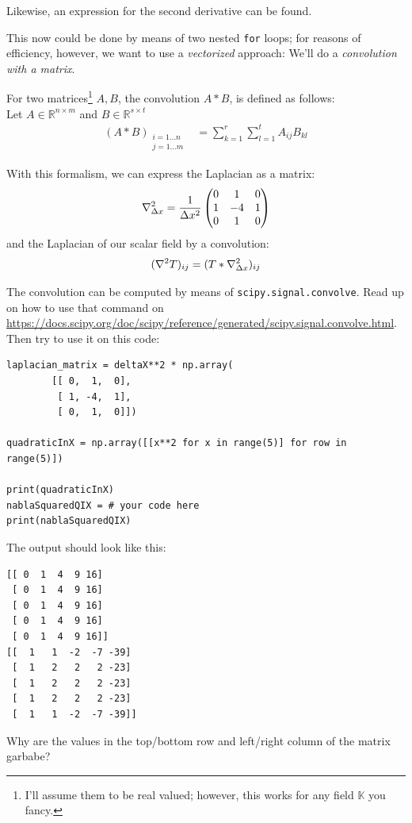 \documentclass[
	english,
	fontsize=10pt,
	parskip=half,
	titlepage=true,
	DIV=12
]{scrartcl}
\newcommand*{\inPy}[1]{\texttt{#1}}
\begin{document}
Likewise, an expression for the second derivative can be found.

This now could be done by means of two nested \inPy{for} loops; for reasons of efficiency, however, we want to use a \emph{vectorized} approach: We'll do a \emph{convolution with a matrix}.

For two matrices\footnote{I'll assume them to be real valued; however, this works for any field $\mathbb{K}$ you fancy.} $A, B$, the convolution $A \ast B$, is defined as follows:\\
Let $A \in \mathbb{R}^{n \times m}$ and $B \in \mathbb{R}^{s \times t}$
\begin{align*}
	(A \ast B)_{\substack{
		i = 1 ... n\\
		j = 1 ... m
	}}
&=
	\sum_{k = 1}^{r}
	\sum_{l = 1}^{t}
		A_{ij} B_{kl}
\end{align*}

With this formalism, we can express the Laplacian as a matrix:
\[ 
	\laplacian_{\Delta x} 
= 
	\frac{1}{\Delta x^2}
	\begin{pmatrix}
		 0 &  1 &  0 \\
		 1 & -4 &  1 \\
		 0 &  1 &  0
	\end{pmatrix}
\]
and the Laplacian of our scalar field by a convolution:
\[ (\laplacian T)_{ij} = (T \ast \laplacian_{\Delta x})_{ij} \]

The convolution can be computed by means of \texttt{scipy.signal.convolve}. Read up on how to use that command on \url{https://docs.scipy.org/doc/scipy/reference/generated/scipy.signal.convolve.html}. Then try to use it on this code:
\begin{verbatim}
laplacian_matrix = deltaX**2 * np.array(
        [[ 0,  1,  0],
         [ 1, -4,  1],
         [ 0,  1,  0]])

quadraticInX = np.array([[x**2 for x in range(5)] for row in range(5)])

print(quadraticInX)
nablaSquaredQIX = # your code here
print(nablaSquaredQIX)
\end{verbatim}

The output should look like this:
\begin{verbatim}
[[ 0  1  4  9 16]
 [ 0  1  4  9 16]
 [ 0  1  4  9 16]
 [ 0  1  4  9 16]
 [ 0  1  4  9 16]]
[[  1   1  -2  -7 -39]
 [  1   2   2   2 -23]
 [  1   2   2   2 -23]
 [  1   2   2   2 -23]
 [  1   1  -2  -7 -39]]
\end{verbatim}

Why are the values in the top/bottom row and left/right column of the matrix garbabe?
\end{document}
